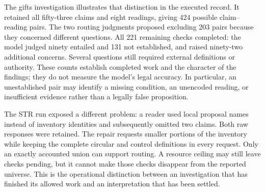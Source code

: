 The gifts investigation illustrates that distinction in the executed record.
It retained all fifty-three claims and eight readings, giving 424 possible
claim--reading pairs. The two routing judgments proposed excluding 203 pairs
because they concerned different questions. All 221 remaining checks completed:
the model judged ninety entailed and 131 not established, and raised ninety-two
additional concerns. Several questions still required external definitions or
authority. These counts establish completed work and the character of the
findings; they do not measure the model's legal accuracy. In particular, an
unestablished pair may identify a missing condition, an unencoded reading, or
insufficient evidence rather than a legally false proposition.

The STR run exposed a different problem: a reader used local proposal names
instead of inventory identities and subsequently omitted two claims. Both raw
responses were retained. The repair requests smaller portions of the inventory
while keeping the complete circular and control definitions in every request.
Only an exactly accounted union can support routing. A resource ceiling may
still leave checks pending, but it cannot make those checks disappear from the
reported universe. This is the operational distinction between an investigation
that has finished its allowed work and an interpretation that has been settled.
